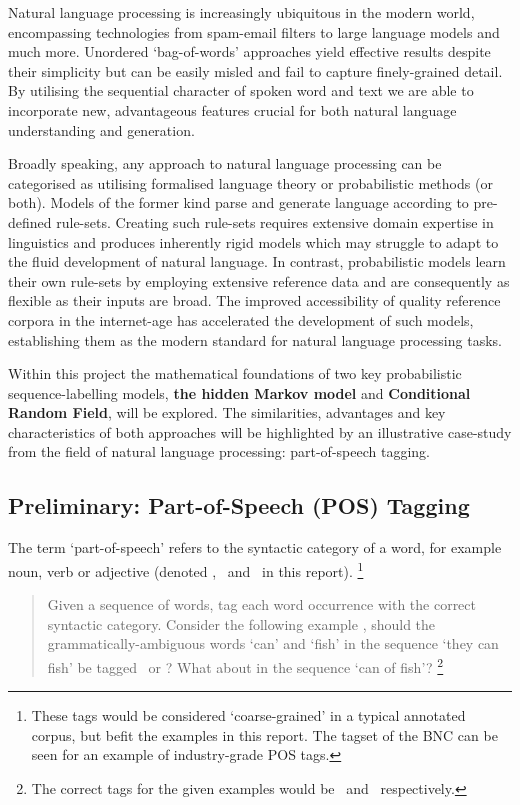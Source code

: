 \documentclass[../main.tex]{subfiles}
\begin{document}
Natural language processing is increasingly ubiquitous in the modern world, encompassing technologies from spam-email filters to large language models and much more.
Unordered `bag-of-words' approaches yield effective results despite their simplicity but can be easily misled and fail to capture finely-grained detail.
By utilising the sequential character of spoken word and text we are able to incorporate new, advantageous features crucial for both natural language understanding and generation.

Broadly speaking, any approach to natural language processing can be categorised as utilising formalised language theory or probabilistic methods (or both).
Models of the former kind parse and generate language according to pre-defined rule-sets. Creating such rule-sets requires extensive domain expertise in linguistics and produces inherently rigid models which may struggle to adapt to the fluid development of natural language.
In contrast, probabilistic models learn their own rule-sets by employing extensive reference data and are consequently as flexible as their inputs are broad. The improved accessibility of quality reference corpora in the internet-age has accelerated the development of such models, establishing them as the modern standard for natural language processing tasks.

Within this project the mathematical foundations of two key probabilistic sequence-labelling models, \textbf{the hidden Markov model} and \textbf{Conditional Random Field}, will be explored.
The similarities, advantages and key characteristics of both approaches will be highlighted by an illustrative case-study from the field of natural language processing: part-of-speech tagging.

\subsection{Preliminary: Part-of-Speech (POS) Tagging}

The term `part-of-speech' refers to the syntactic category of a word, for example noun, verb or adjective (denoted \noun,  \verbsym\ and \adj\ in this report).
\footnote{These tags would be considered `coarse-grained' in a typical annotated corpus, but befit the examples in this report. The tagset of the BNC \autocite{bnc-corpus} can be seen for an example of industry-grade POS tags.}

\begin{quote}
    Given a sequence of words, tag each word occurrence with the correct syntactic category. Consider the following example \autocite{eisenstein-nlp-2019}, should the grammatically-ambiguous words `can' and `fish' in the sequence `they can fish' be tagged \noun\ or \verbsym ? What about in the sequence `can of fish'?
    \footnote{The correct tags for the given examples would be \verbsym \verbsym\ and \noun \noun\ respectively.}
\end{quote}
\end{document}
